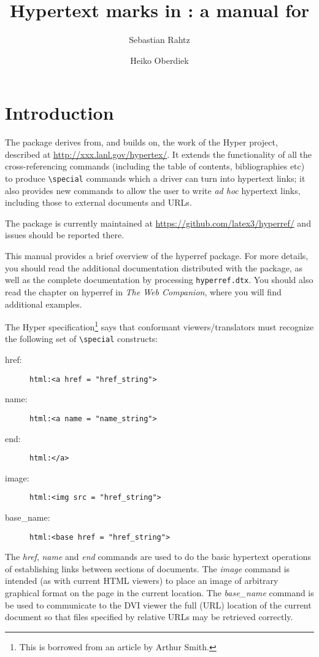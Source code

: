 \documentclass[pdftex]{article}
\title{Hypertext marks in \hologo{LaTeX}: a manual for \xpackage{hyperref}}
\author{Sebastian Rahtz \and  Heiko Oberdiek}
\date{\mydate}
\newcommand*{\cs}[1]{%
  \texttt{\textbackslash #1}%
}
\newcommand*{\xpackage}[1]{\textsf{#1}}
\begin{document}
\thispagestyle{empty}
\maketitle
\tableofcontents
\setcounter{tocdepth}{2}%

\section{Introduction}

The package derives from, and builds on, the work of the Hyper
project, described at \url{http://xxx.lanl.gov/hypertex/}. It extends
the functionality of all the  cross-referencing commands
(including the table of contents, bibliographies etc) to produce
\cs{special} commands which a driver can turn into hypertext links;
it also provides new commands to allow the user to write \emph{ad hoc}
hypertext links, including those to external documents and URLs.

The package is currently maintained at \url{https://github.com/latex3/hyperref/} and issues should
be reported there.

This manual provides a brief overview of the \xpackage{hyperref}
package. For more details, you should read the additional documentation
distributed with the package, as well as the complete documentation by
processing \texttt{hyperref.dtx}. You should also read the chapter on
\xpackage{hyperref} in \textit{The  Web Companion}, where you will
find additional examples.

The Hyper specification\footnote{This is borrowed from an article
by Arthur Smith.} says that conformant viewers/translators must
recognize the following set of \cs{special} constructs:

\begin{description}
\item[href:] \verb|html:<a href = "href_string">|
\item[name:] \verb|html:<a name = "name_string">|
\item[end:] \verb|html:</a>|
\item[image:] \verb|html:<img src = "href_string">|
\item[base\_name:] \verb|html:<base href = "href_string">|
\end{description}

The \emph{href}, \emph{name} and \emph{end} commands are used to do the
basic hypertext operations of establishing links between sections of
documents. The \emph{image} command is intended (as with current HTML
viewers) to place an image of arbitrary graphical format on the page in
the current location. The \emph{base\_name} command is be used to
communicate to the DVI viewer the full (URL) location of the current
document so that files specified by relative URLs may be retrieved
correctly.
\end{document}
